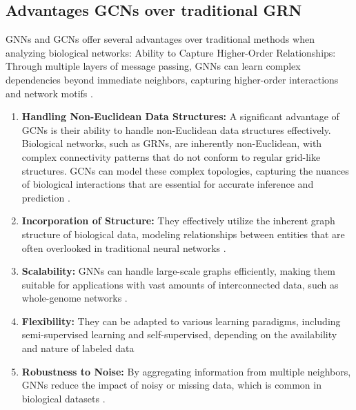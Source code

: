 \documentclass{article}
\begin{document}
\subsection{Advantages GCNs over traditional GRN}
GNNs and GCNs offer several advantages over traditional methods when analyzing biological networks:
Ability to Capture Higher-Order Relationships: Through multiple layers of message passing, GNNs can learn complex dependencies beyond immediate neighbors, capturing higher-order interactions and network motifs \cite{he2023hdgcn}.

\begin{enumerate}
\item \textbf{Handling Non-Euclidean Data Structures:} 
A significant advantage of GCNs is their ability to handle non-Euclidean data structures effectively. Biological networks, such as GRNs, are inherently non-Euclidean, with complex connectivity patterns that do not conform to regular grid-like structures. GCNs can model these complex topologies, capturing the nuances of biological interactions that are essential for accurate inference and prediction \cite{asif2021graph}.

\item \textbf{Incorporation of Structure:} 
They effectively utilize the inherent graph structure of biological data, modeling relationships between entities that are often overlooked in traditional neural networks \cite{gcn_review}.

\item \textbf{Scalability:}
GNNs can handle large-scale graphs efficiently, making them suitable for applications with vast amounts of interconnected data, such as whole-genome networks \cite{ma2022scalability}.

\item \textbf{Flexibility:}
They can be adapted to various learning paradigms, including semi-supervised learning and self-supervised, depending on the availability and nature of labeled data \cite{wang2021semi, yang2024self}

\item \textbf{Robustness to Noise:}
By aggregating information from multiple neighbors, GNNs reduce the impact of noisy or missing data, which is common in biological datasets \cite{shi2022feature}.
\end{enumerate}
\end{document}
